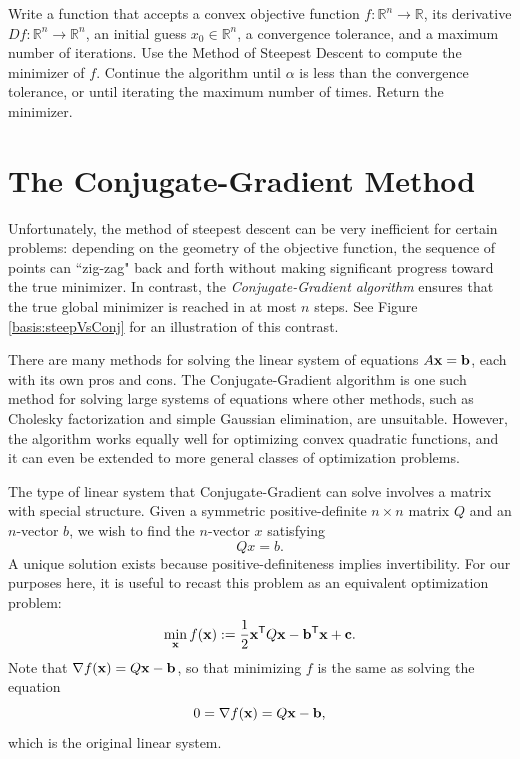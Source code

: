 \begin{problem}
Write a function that accepts a convex objective function $f:\mathbb{R}^n\rightarrow\mathbb{R}$, its derivative $Df:\mathbb{R}^n\rightarrow\mathbb{R}^n$, an initial guess $x_0\in\mathbb{R}^n$, a convergence tolerance, and a maximum number of iterations.
Use the Method of Steepest Descent to compute the minimizer of $f$.
Continue the algorithm until $\alpha$ is less than the convergence tolerance, or until iterating the maximum number of times.
Return the minimizer.
\end{problem}

\section*{The Conjugate-Gradient Method} %

Unfortunately, the method of steepest descent can be very inefficient for certain problems: depending on the geometry of the objective function, the sequence of points can ``zig-zag" back and forth without making significant progress toward the true minimizer.
In contrast, the \emph{Conjugate-Gradient algorithm} ensures that the true global minimizer is reached in at most $n$ steps. See
Figure \ref{basis:steepVsConj} for an illustration of this contrast.

There are many methods for solving the linear system of equations $A\mathbf{x} = \mathbf{b}$, each with its own pros and cons.
The Conjugate-Gradient algorithm is one such method for solving large systems of equations where other methods, such as Cholesky factorization and simple Gaussian elimination, are unsuitable.
However, the algorithm works equally well for optimizing convex quadratic functions, and it can even be extended to more general classes of optimization problems.

The type of linear system that Conjugate-Gradient can solve involves a matrix with special structure.
Given a symmetric positive-definite $n\times n$ matrix $Q$ and an $n$-vector $b$, we wish to find the $n$-vector $x$ satisfying
\[
Qx = b.
\]
A unique solution exists because positive-definiteness implies invertibility.
For our purposes here, it is useful to recast this problem as an equivalent optimization problem:
\[
\min_{\mathbf{x}} f(\mathbf{x}) := \frac{1}{2}\mathbf{x}^{\mathsf T} Q\mathbf{x} - \mathbf{b}^{\mathsf T}\mathbf{x} + \mathbf{c}.
\]
Note that $\nabla f(\mathbf{x}) = Q\mathbf{x} - \mathbf{b}$, so that minimizing $f$ is the same as solving the equation \[ 0 = \nabla f(\mathbf{x}) = Q\mathbf{x} - \mathbf{b}, \]
which is the original linear system.

